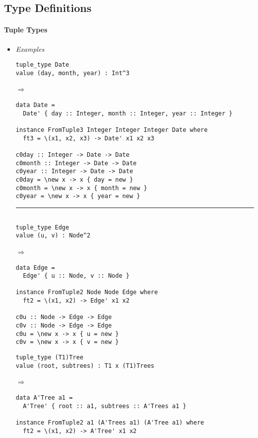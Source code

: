 \documentclass[diploma]{softlab-thesis}
\def\lra{$\Longrightarrow$\ }
\begin{document}
\newpage
\subsection{Type Definitions}
\label{subsubsec:trantypedef}

\paragraph{Tuple Types}

\begin{itemize}
\item
\textit{Examples}

\begin{verbatim}
tuple_type Date
value (day, month, year) : Int^3
\end{verbatim}
\lra
\begin{verbatim}
data Date =
  Date' { day :: Integer, month :: Integer, year :: Integer }

instance FromTuple3 Integer Integer Integer Date where
  ft3 = \(x1, x2, x3) -> Date' x1 x2 x3

c0day :: Integer -> Date -> Date
c0month :: Integer -> Date -> Date
c0year :: Integer -> Date -> Date
c0day = \new x -> x { day = new }
c0month = \new x -> x { month = new }
c0year = \new x -> x { year = new }

\end{verbatim}

\rule{\linewidth}{0.1pt}

\begin{verbatim}

tuple_type Edge
value (u, v) : Node^2
\end{verbatim}
\lra
\begin{verbatim}
data Edge =
  Edge' { u :: Node, v :: Node }

instance FromTuple2 Node Node Edge where
  ft2 = \(x1, x2) -> Edge' x1 x2

c0u :: Node -> Edge -> Edge
c0v :: Node -> Edge -> Edge
c0u = \new x -> x { u = new }
c0v = \new x -> x { v = new }
\end{verbatim}

\newpage
\begin{verbatim}
tuple_type (T1)Tree
value (root, subtrees) : T1 x (T1)Trees
\end{verbatim}
\lra
\begin{verbatim}
data A'Tree a1 =
  A'Tree' { root :: a1, subtrees :: A'Trees a1 }

instance FromTuple2 a1 (A'Trees a1) (A'Tree a1) where
  ft2 = \(x1, x2) -> A'Tree' x1 x2


\end{verbatim}
\end{itemize}
\end{document}
